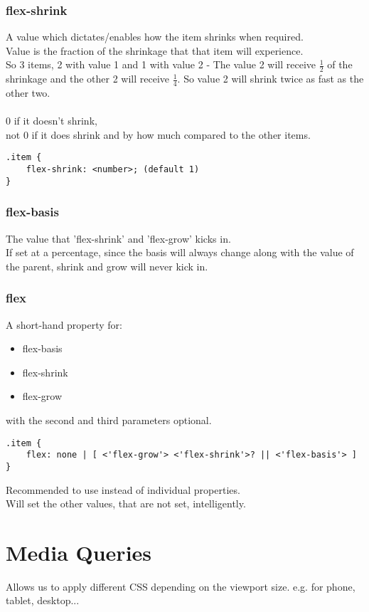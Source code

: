 \documentclass[]{article}
\newcommand{\<}{\guilsinglleft}
\renewcommand{\>}{\guilsinglright}
\begin{document}
\subsubsection{flex-shrink}
A value which dictates/enables how the item shrinks when required.
\\
Value is the fraction of the shrinkage that that item will experience.
\\
So 3 items, 2 with value 1 and 1 with value 2 - The value 2 will receive $\frac{1}{2}$ of the shrinkage and the other 2 will receive $\frac{1}{4}$.  So value 2 will shrink twice as fast as the other two.
\\\\
0 if it doesn't shrink, \\
not 0 if it does shrink and by how much compared to the other items.
\begin{lstlisting}
.item {
	flex-shrink: <number>; (default 1)
}
\end{lstlisting}

\subsubsection{flex-basis}
The value that 'flex-shrink' and 'flex-grow' kicks in.
\\
If set at a percentage, since the basis will always change along with the value of the parent, shrink and grow will never kick in.

\subsubsection{flex}
A short-hand property for:
\begin{itemize}
	\item flex-basis
	\item flex-shrink
	\item flex-grow
\end{itemize}
with the second and third parameters optional.
\begin{lstlisting}
.item {
	flex: none | [ <'flex-grow'> <'flex-shrink'>? || <'flex-basis'> ]
}
\end{lstlisting}
Recommended to use instead of individual properties.
\\
Will set the other values, that are not set, intelligently.

\section{Media Queries}
Allows us to apply different CSS depending on the viewport size. e.g. for phone, tablet, desktop...
\end{document}

